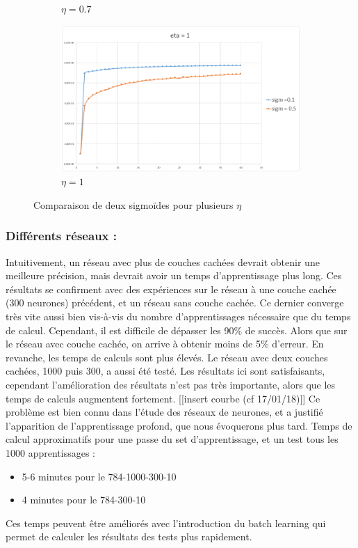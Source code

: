 \begin{figure}[ht!]
\begin{subfigure}[b]{.5\linewidth}
    \caption{$\eta=0.7$}
  \end{subfigure}
  \begin{subfigure}[b]{.5\linewidth}
    \includegraphics[width=\linewidth]{fig/MNIST_inflsigm_eta1.png}
    \caption{$\eta=1$}
  \end{subfigure}
  \caption{Comparaison de deux sigmoïdes pour plusieurs $\eta$}
  \label{fig:MNIST_inflsigm}
\end{figure}

\subsubsection*{Différents réseaux :} 
Intuitivement, un réseau avec plus de couches cachées devrait obtenir une meilleure précision, mais devrait avoir un temps d’apprentissage plus long. Ces résultats se confirment avec des expériences sur le réseau à une couche cachée (300 neurones) précédent, et un réseau sans couche cachée. Ce dernier converge très vite aussi bien vis-à-vis du nombre d’apprentissages nécessaire que du temps de calcul. Cependant, il est difficile de dépasser les 90\% de succès. Alors que sur le réseau avec couche cachée, on arrive à obtenir moins de 5\% d’erreur. En revanche, les temps de calculs sont plus élevés. Le réseau avec deux couches cachées, 1000 puis 300, a aussi été testé. Les résultats ici sont satisfaisants, cependant l’amélioration des résultats n’est pas très importante, alors que les temps de calculs augmentent fortement.
[[insert courbe (cf 17/01/18)]]
Ce problème est bien connu dans l'étude des réseaux de neurones, et a justifié l'apparition de l'apprentissage profond, que nous évoquerons plus tard.
Temps de calcul approximatifs pour une passe du set d’apprentissage, et un test tous les 1000 apprentissages :
\begin{itemize}
	\item 5-6 minutes pour le 784-1000-300-10
	\item 4 minutes pour le 784-300-10 
\end{itemize}
Ces temps peuvent être améliorés avec l’introduction du batch learning qui permet de calculer les résultats des tests plus rapidement.